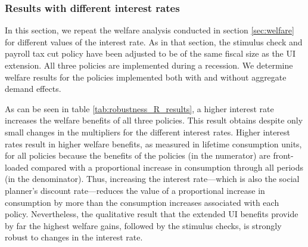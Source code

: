 \documentclass[\econtexRoot/HAFiscal]{subfiles}
\begin{document}
\subsubsection{Results with different interest rates}
\notinsubfile{\label{sec:robust_R_results}}

In this section, we repeat the welfare analysis conducted in section \ref{sec:welfare} for different values of the interest rate. As in that section, the stimulus check and payroll tax cut policy have been adjusted to be of the same fiscal size as the UI extension. All three policies are implemented during a recession. We determine welfare results for the policies implemented both with and without aggregate demand effects.

As can be seen in table \ref{tab:robustness_R_results}, a higher interest rate increases the welfare benefits of all three policies. This result obtains despite only small changes in the multipliers for the different interest rates. Higher interest rates result in higher welfare benefits, as measured in lifetime consumption units, for all policies because the benefits of the policies (in the numerator) are front-loaded compared with a proportional increase in consumption through all periods (in the denominator). Thus, increasing the interest rate---which is also the social planner's discount rate---reduces the value of a proportional increase in consumption by more than the consumption increases associated with each policy.  Nevertheless, the qualitative result that the extended UI benefits provide by far the highest welfare gains, followed by the stimulus checks, is strongly robust to changes in the interest rate.
\end{document}
